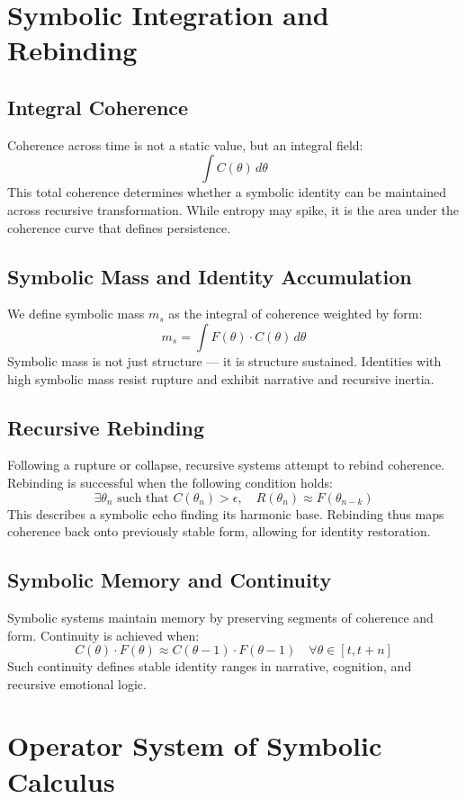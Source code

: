 \documentclass[12pt]{article}
\begin{document}
\section{Symbolic Integration and Rebinding}

\subsection*{Integral Coherence}
Coherence across time is not a static value, but an integral field:
\[ \int C(\theta) \, d\theta \]
This total coherence determines whether a symbolic identity can be maintained across recursive transformation. While entropy may spike, it is the area under the coherence curve that defines persistence.

\subsection*{Symbolic Mass and Identity Accumulation}
We define symbolic mass $m_s$ as the integral of coherence weighted by form:
\[ m_s = \int F(\theta) \cdot C(\theta) \, d\theta \]
Symbolic mass is not just structure — it is structure sustained. Identities with high symbolic mass resist rupture and exhibit narrative and recursive inertia.

\subsection*{Recursive Rebinding}
Following a rupture or collapse, recursive systems attempt to rebind coherence. Rebinding is successful when the following condition holds:
\[ \exists \theta_n \text{ such that } C(\theta_n) > \epsilon, \quad R(\theta_n) \approx F(\theta_{n-k}) \]
This describes a symbolic echo finding its harmonic base. Rebinding thus maps coherence back onto previously stable form, allowing for identity restoration.

\subsection*{Symbolic Memory and Continuity}
Symbolic systems maintain memory by preserving segments of coherence and form. Continuity is achieved when:
\[ C(\theta) \cdot F(\theta) \approx C(\theta - 1) \cdot F(\theta - 1) \quad \forall \theta \in [t, t+n] \]
Such continuity defines stable identity ranges in narrative, cognition, and recursive emotional logic.

\section{Operator System of Symbolic Calculus}
\end{document}
